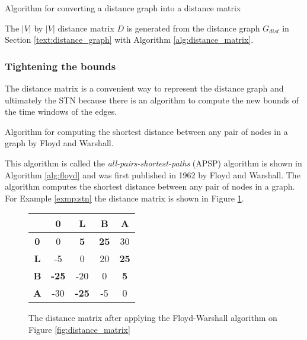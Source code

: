 \documentclass{article}
\theoremstyle{definition}
\providecommand{\SetAlgoLined}{\SetLine}
\newcommand{\weight}[2]{\ensuremath{weight(t_{#1}, t_{#2})}} %
\newenvironment{definition}[1][Definition]{\begin{trivlist}
\item[\hskip \labelsep {\bfseries #1}]}{\end{trivlist}}
\begin{document}
\begin{algorithm}[H]
\label{alg:distance_matrix}
\SetAlgoLined
\ForAll{$(t_i, t_j) \in E_{dist}$}{
	$D_{ij} = \weight{i}{j}$\;
}
\caption{Algorithm for converting a distance graph into a distance matrix}
\end{algorithm}

\begin{definition}
The $|V|$ by $|V|$ distance matrix $D$ is generated from the distance graph $G_{dist}$ in Section \ref{text:distance_graph} with Algorithm \ref{alg:distance_matrix}.
\end{definition}

\subsubsection{Tightening the bounds}
\label{text:floyd}
The distance matrix is a convenient way to represent the distance graph and ultimately the STN because there is an algorithm to compute the new bounds of the time windows of the edges. 

\begin{algorithm}[H]
\label{alg:floyd}
\SetAlgoLined
{}
\caption{Algorithm for computing the shortest distance between any pair of nodes in a graph by Floyd and Warshall. }
\end{algorithm}

This algorithm is called the \emph{all-pairs-shortest-paths} (APSP) algorithm \cite{dechter91} is shown in Algorithm \ref{alg:floyd} and was first published in 1962 by Floyd and Warshall.
The algorithm computes the shortest distance between any pair of nodes in a graph.
For Example \ref{exmp:stn} the distance matrix is shown in Figure \ref{fig:stn_dist_matrix}.

\begin{figure}[h]
	\centering
	\begin{tabular}{ c | c c c c }
	  			& \textbf{0}		& \textbf{L} 		& \textbf{B} 		& \textbf{A} \\ \hline
	  \textbf{0} 	& 0 				& \textbf{5}		& \textbf{25} 	& 30 \\
	  \textbf{L} 	& -5 			& 0				& 20			& \textbf{25} \\
	  \textbf{B} 	& \textbf{-25}	& -20			& 0				& \textbf{5} \\
	  \textbf{A} 	& -30			& \textbf{-25}	& -5 			& 0 \\
	\end{tabular}
	\caption{The distance matrix after applying the Floyd-Warshall algorithm on Figure \ref{fig:distance_matrix}}
	\label{fig:stn_dist_matrix}
\end{figure}
\end{document}
